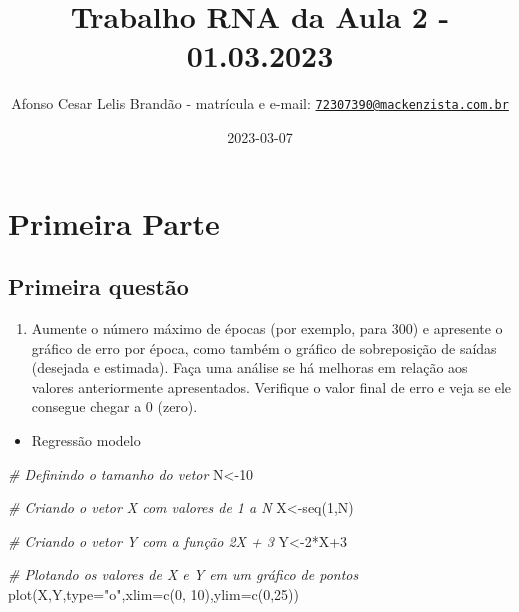 \documentclass[
]{article}
\title{Trabalho RNA da Aula 2 - 01.03.2023}
\author{Afonso Cesar Lelis Brandão - matrícula e e-mail:
\href{mailto:72307390@mackenzista.com.br}{\nolinkurl{72307390@mackenzista.com.br}}}
\date{2023-03-07}
\newenvironment{Shaded}{\begin{snugshade}}{\end{snugshade}}
\newcommand{\AttributeTok}[1]{\textcolor[rgb]{0.77,0.63,0.00}{#1}}
\newcommand{\CommentTok}[1]{\textcolor[rgb]{0.56,0.35,0.01}{\textit{#1}}}
\newcommand{\DecValTok}[1]{\textcolor[rgb]{0.00,0.00,0.81}{#1}}
\newcommand{\FunctionTok}[1]{\textcolor[rgb]{0.00,0.00,0.00}{#1}}
\newcommand{\NormalTok}[1]{#1}
\newcommand{\OtherTok}[1]{\textcolor[rgb]{0.56,0.35,0.01}{#1}}
\newcommand{\SpecialCharTok}[1]{\textcolor[rgb]{0.00,0.00,0.00}{#1}}
\newcommand{\StringTok}[1]{\textcolor[rgb]{0.31,0.60,0.02}{#1}}
\providecommand{\tightlist}{%
  \setlength{\itemsep}{0pt}\setlength{\parskip}{0pt}}
\begin{document}
\maketitle

\hypertarget{primeira-parte}{%
\section{Primeira Parte}\label{primeira-parte}}

\hypertarget{primeira-questuxe3o}{%
\subsection{Primeira questão}\label{primeira-questuxe3o}}

\begin{enumerate}
\def\labelenumi{\arabic{enumi})}
\tightlist
\item
  Aumente o número máximo de épocas (por exemplo, para 300) e apresente
  o gráfico de erro por época, como também o gráfico de sobreposição de
  saídas (desejada e estimada). Faça uma análise se há melhoras em
  relação aos valores anteriormente apresentados. Verifique o valor
  final de erro e veja se ele consegue chegar a 0 (zero).
\end{enumerate}

\begin{itemize}
\tightlist
\item
  Regressão modelo
\end{itemize}

\begin{Shaded}
\begin{Highlighting}[]
\CommentTok{\# Definindo o tamanho do vetor}
\NormalTok{N}\OtherTok{\textless{}{-}}\DecValTok{10}

\CommentTok{\# Criando o vetor X com valores de 1 a N}
\NormalTok{X}\OtherTok{\textless{}{-}}\FunctionTok{seq}\NormalTok{(}\DecValTok{1}\NormalTok{,N)}

\CommentTok{\# Criando o vetor Y com a função 2X + 3}
\NormalTok{Y}\OtherTok{\textless{}{-}}\DecValTok{2}\SpecialCharTok{*}\NormalTok{X}\SpecialCharTok{+}\DecValTok{3}

\CommentTok{\# Plotando os valores de X e Y em um gráfico de pontos}
\FunctionTok{plot}\NormalTok{(X,Y,}\AttributeTok{type=}\StringTok{"o"}\NormalTok{,}\AttributeTok{xlim=}\FunctionTok{c}\NormalTok{(}\DecValTok{0}\NormalTok{, }\DecValTok{10}\NormalTok{),}\AttributeTok{ylim=}\FunctionTok{c}\NormalTok{(}\DecValTok{0}\NormalTok{,}\DecValTok{25}\NormalTok{))}
\end{Highlighting}
\end{Shaded}
\end{document}
